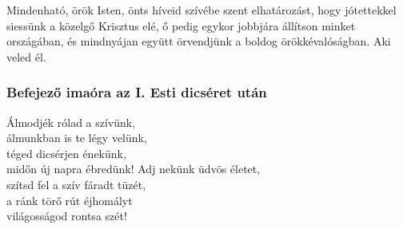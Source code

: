 \documentclass[twoside]{article}
\begin{document}
Mindenható, örök Isten, önts híveid szívébe szent elhatározást, hogy jótettekkel siessünk a közelgő Krisztus elé, ő pedig egykor jobbjára állítson minket országában, és mindnyájan együtt örvendjünk a boldog örökkévalóságban. Aki veled él.


\subsubsection*{Befejező imaóra az I. Esti dicséret után}


\begin{hymnstanzas}
    Álmodjék rólad a szívünk, \\
    álmunkban is te légy velünk, \\
    téged dicsérjen énekünk, \\
    midőn új napra ébredünk!
\stanzabreak
    Adj nekünk üdvös életet, \\
    szítsd fel a szív fáradt tüzét, \\
    a ránk törő rút éjhomályt \\
    világosságod rontsa szét!
\end{hymnstanzas}
\end{document}

